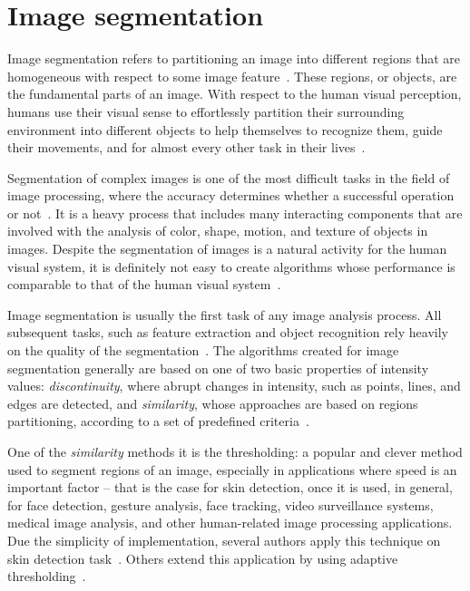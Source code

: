 \section{Image segmentation}
\label{sec:image_segmentation}
Image segmentation refers to partitioning an image into different regions that are homogeneous with respect to some image feature~\citep{gonzalez:02}. These regions, or objects, are the fundamental parts of an image. With respect to the human visual perception, humans use their visual sense to effortlessly partition their surrounding environment into different objects to help themselves to recognize them, guide their movements, and for almost every other task in their lives~\citep{konstantinos:00}.

Segmentation of complex images is one of the most difficult tasks in the field of image processing, where the accuracy determines whether a successful operation or not~\citep{gonzalez:02}. It is a heavy process that includes many interacting components that are involved with the analysis of color, shape, motion, and texture of objects in images. Despite the segmentation of images is a natural activity for the human visual system, it is definitely not easy to create algorithms whose performance is comparable to that of the human visual system~\citep{konstantinos:00}.

Image segmentation is usually the first task of any image analysis process. All subsequent tasks, such as feature extraction and object recognition rely heavily on the quality of the segmentation~\citep{konstantinos:00}. The algorithms created for image segmentation generally are based on one of two basic properties of intensity values: \emph{discontinuity}, where abrupt changes in intensity, such as points, lines, and edges are detected, and \emph{similarity}, whose approaches are based on regions partitioning, according to a set of predefined criteria~\citep{gonzalez:02}.

One of the \emph{similarity} methods it is the thresholding: a popular and clever method used to segment regions of an image, especially in applications where speed is an important factor -- that is the case for skin detection, once it is used, in general, for face detection, gesture analysis, face tracking, video surveillance systems, medical image analysis, and other human-related image processing applications. Due the simplicity of implementation, several authors apply this technique on skin detection task~\citep{kovac:03, chai:99, basilio:11, kaur:12, shaik:15, kumar:15}. Others extend this application by using adaptive thresholding~\citep{yogarajah:11, tan:12}.

